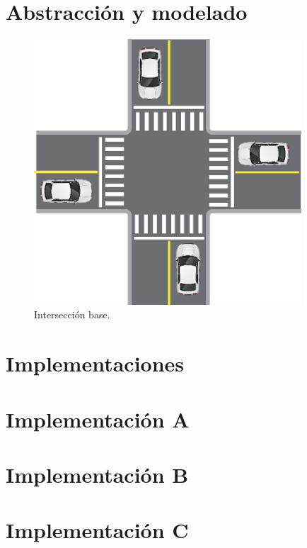 \section{Abstracción y modelado}
\begin{figure}
	\centering
	\includegraphics[width=10cm]{imagenes/interseccion-base.eps}
	\caption{Intersección base.}
	\label{fig:interseccion-base}
\end{figure}

\section{Implementaciones}
\section{Implementación A}
\section{Implementación B}
\section{Implementación C}
